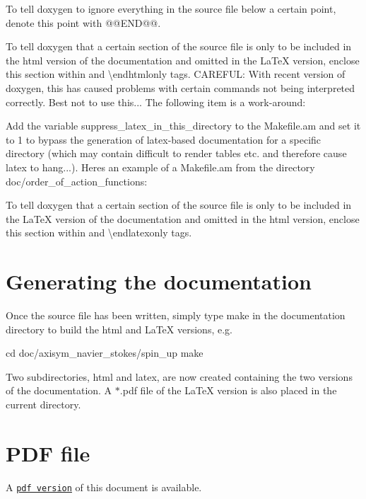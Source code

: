 \begin{DoxyItemize}
\item To tell {\ttfamily doxygen} to ignore everything in the source file below a certain point, denote this point with {\ttfamily @@E\+ND@@}.
\item To tell {\ttfamily doxygen} that a certain section of the source file is only to be included in the {\ttfamily html} version of the documentation and omitted in the {\ttfamily La\+TeX} version, enclose this section within { and} {\ttfamily \textbackslash{}endhtmlonly} tags. C\+A\+R\+E\+F\+UL\+: With recent version of doxygen, this has caused problems with certain commands not being interpreted correctly. Best not to use this... The following item is a work-\/around\+:
\item Add the variable {\ttfamily suppress\+\_\+latex\+\_\+in\+\_\+this\+\_\+directory} to the Makefile.\+am and set it to 1 to bypass the generation of latex-\/based documentation for a specific directory (which may contain difficult to render tables etc. and therefore cause latex to hang...). Here\textquotesingle{}s an example of a Makefile.\+am from the directory {\ttfamily doc/order\+\_\+of\+\_\+action\+\_\+functions}\+: 

\item To tell {\ttfamily doxygen} that a certain section of the source file is only to be included in the {\ttfamily La\+TeX} version of the documentation and omitted in the {\ttfamily html} version, enclose this section within { and} {\ttfamily \textbackslash{}endlatexonly} tags.
\end{DoxyItemize}

\hypertarget{index_generate}{}\section{Generating the documentation}\label{index_generate}
Once the source file has been written, simply type {\ttfamily make} in the documentation directory to build the {\ttfamily html} and {\ttfamily La\+TeX} versions, e.\+g. 
\begin{DoxyCode}
cd doc/axisym\_navier\_stokes/spin\_up
make
\end{DoxyCode}
 Two subdirectories, {\ttfamily html} and {\ttfamily latex}, are now created containing the two versions of the documentation. A {\ttfamily $\ast$}.{\ttfamily pdf} file of the {\ttfamily La\+TeX} version is also placed in the current directory.



 

 \hypertarget{index_pdf}{}\section{P\+D\+F file}\label{index_pdf}
A \href{../latex/refman.pdf}{\tt pdf version} of this document is available. 
